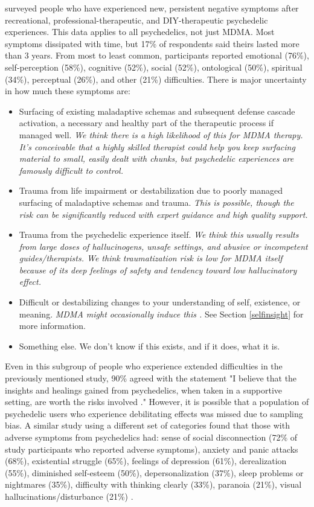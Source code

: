 \documentclass[12pt,letterpaper]{book}
\begin{document}
\textcite{evans2023extended} surveyed people who have experienced new, persistent negative symptoms after recreational, professional-therapeutic, and DIY-therapeutic psychedelic experiences. This data applies to all psychedelics, not just MDMA. Most symptoms dissipated with time, but 17\% of respondents said theirs lasted more than 3 years. From most to least common, participants reported emotional (76\%), self-perception (58\%), cognitive (52\%), social (52\%), ontological (50\%), spiritual (34\%), perceptual (26\%), and other (21\%) difficulties. There is major uncertainty in how much these symptoms are:
\begin{itemize}
	\item Surfacing of existing maladaptive schemas and subsequent defense cascade activation, a necessary and healthy part of the therapeutic process if managed well. \textit{We think there is a high likelihood of this for MDMA therapy. It's conceivable that a highly skilled therapist could help you keep surfacing material to small, easily dealt with chunks, but psychedelic experiences are famously difficult to control.}
	\item Trauma from life impairment or destabilization due to poorly managed surfacing of maladaptive schemas and trauma. \textit{This is possible, though the risk can be significantly reduced with expert guidance and high quality support.}
	\item Trauma from the psychedelic experience itself. \textit{We think this usually results from large doses of hallucinogens, unsafe settings, and abusive or incompetent guides/therapists. We think traumatization risk is low for MDMA itself because of its deep feelings of safety and tendency toward low hallucinatory effect.}
	\item Difficult or destabilizing changes to your understanding of self, existence, or meaning. \textit{MDMA might occasionally induce this \cite{mdmaExtendedEvans}.} See Section \ref{selfinsight} for more information.
	\item Something else. We don't know if this exists, and if it does, what it is.
\end{itemize}
Even in this subgroup of people who experience extended difficulties in the previously mentioned study, 90\% agreed with the statement "I believe that the insights and healings gained from psychedelics, when taken in a supportive setting, are worth the risks involved \cite{evans2023extended}." However, it is possible that a population of psychedelic users who experience debilitating effects was missed due to sampling bias. A similar study using a different set of categories found that those with adverse symptoms from psychedelics had: sense of social disconnection (72\% of study participants who reported adverse symptoms), anxiety and panic attacks (68\%), existential struggle (65\%), feelings of depression (61\%), derealization (55\%), diminished self-esteem (50\%), depersonalization (37\%), sleep problems or nightmares (35\%), difficulty with thinking clearly (33\%), paranoia (21\%), visual hallucinations/disturbance (21\%) \cite{robinson2024investigation}.
\end{document}
